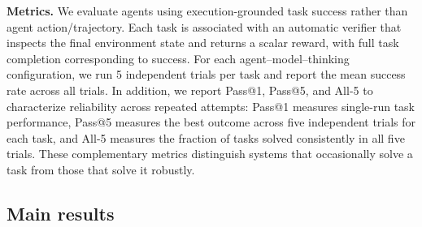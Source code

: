 \documentclass{llmxive}
\begin{document}
\noindent\textbf{Metrics.}
We evaluate agents using execution-grounded task success rather than agent action/trajectory. Each task is associated with an automatic verifier that inspects the final environment state and returns a scalar reward, with full task completion corresponding to success. For each agent--model--thinking configuration, we run 5 independent trials per task and report the mean success rate across all trials. In addition, we report Pass@1, Pass@5, and All-5 to characterize reliability across repeated attempts: Pass@1 measures single-run task performance, Pass@5 measures the best outcome across five independent trials for each task, and All-5 measures the fraction of tasks solved consistently in all five trials. These complementary metrics distinguish systems that occasionally solve a task from those that solve it robustly.

\subsection{Main results}
\label{sec:main-results}
\end{document}
